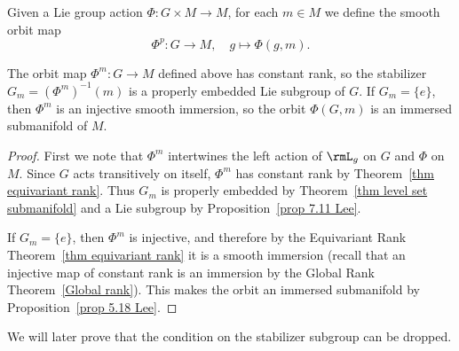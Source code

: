 \begin{defn}
    Given a Lie group action $\Phi:G\times M\to M$, for each $m\in M$ we define the smooth orbit map 
    \[\Phi^p:G\to M,\quad g\mapsto \Phi(g,m).\]
\end{defn}

\begin{prop}
    The orbit map $\Phi^m:G\to M$ defined above has constant rank, so the stabilizer $G_m=(\Phi^m)^{-1}(m)$ is a properly embedded Lie subgroup of $G$. If $G_m=\{e\}$, then $\Phi^m$ is an injective smooth immersion, so the orbit $\Phi(G,m)$ is an immersed submanifold of $M$.
\end{prop}
\begin{proof}
    First we note that $\Phi^m$ intertwines the left action of $\rmL_g$ on $G$ and $\Phi$ on $M$. Since $G$ acts transitively on itself, $\Phi^m$ has constant rank by Theorem~\ref{thm equivariant rank}. Thus $G_m$ is properly embedded by Theorem~\ref{thm level set submanifold} and a Lie subgroup by Proposition~\ref{prop 7.11 Lee}.

    If $G_m=\{e\}$, then $\Phi^m$ is injective, and therefore by the Equivariant Rank Theorem~\ref{thm equivariant rank} it is a smooth immersion (recall that an injective map of constant rank is an immersion by the Global Rank Theorem~\ref{Global rank}). This makes the orbit an immersed submanifold by Proposition~\ref{prop 5.18 Lee}.
\end{proof}
\begin{rem}
    We will later prove that the condition on the stabilizer subgroup can be dropped.
\end{rem}

